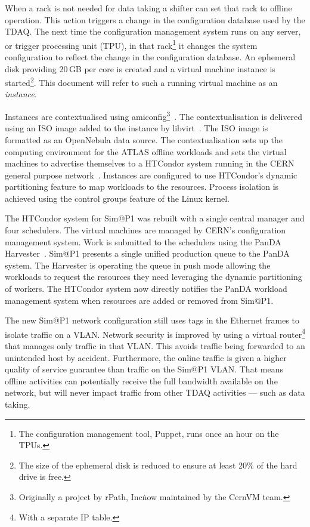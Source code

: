 \documentclass{webofc}
\begin{document}
When a rack is not needed for data taking a shifter can set that rack to
offline operation. This action triggers a change in the configuration database
used by the TDAQ\@. The next time the configuration management system runs on
any server, or trigger processing unit (TPU), in that rack\footnote{The
configuration management tool, Puppet, runs once an hour on the TPUs.} it
changes the system configuration to reflect the change in the configuration
database. An ephemeral disk providing 20\,\textrm{GB} per core is
created and a virtual machine instance is started\footnote{The size of the
ephemeral disk is reduced to ensure at least 20\% of the hard drive is free.}.
This document will refer to such a running virtual machine as an
\textit{instance}.

Instances are contextualised using amiconfig\footnote{Originally a
project by rPath, Inc\. now maintained by the CernVM team.}~\cite{amiconfig}.
The contextualisation is delivered using an ISO image added to the instance
by libvirt~\cite{libvirt}. The ISO image is formatted as an OpenNebula data
source. The contextualisation sets up the computing environment for the ATLAS
offline workloads and sets the virtual machines to advertise themselves to a
HTCondor system running in the CERN general purpose network~\cite{condor}.
Instances are configured to use HTCondor's dynamic partitioning feature to
map workloads to the resources. Process isolation is achieved using the control
groups feature of the Linux kernel.

The HTCondor system for Sim@P1 was rebuilt with a single central manager and
four schedulers. The virtual machines are managed by CERN's configuration
management system. Work is submitted to the schedulers using the PanDA
Harvester~\cite{harvester}. Sim@P1 presents a single unified production queue to
the PanDA system. The Harvester is operating the queue in push mode allowing the
workloads to request the resources they need leveraging the dynamic partitioning
of workers.  The HTCondor system now directly notifies the PanDA workload
management system when resources are added or removed from Sim@P1.

The new Sim@P1 network configuration still uses tags in the Ethernet frames to
isolate traffic on a VLAN\@. Network security is improved by using a virtual
router\footnote{With a separate IP table.} that manages only traffic in that
VLAN\@. This avoids traffic being forwarded to an unintended host by accident.
Furthermore, the online traffic is given a higher quality of service guarantee
than traffic on the Sim@P1 VLAN\@. That means offline activities can potentially
receive the full bandwidth available on the network, but will never impact
traffic from other TDAQ activities --- such as data taking.
\end{document}
